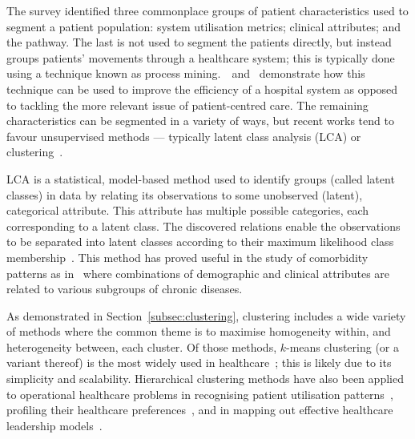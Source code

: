 The survey identified three commonplace groups of patient characteristics used
to segment a patient population: system utilisation metrics; clinical
attributes; and the pathway. The last is not used to segment the patients
directly, but instead groups patients' movements through a healthcare system;
this is typically done using a technique known as process
mining.~\cite{Arnolds2018}~and~\cite{Delias2015} demonstrate how this technique
can be used to improve the efficiency of a hospital system as opposed to
tackling the more relevant issue of patient-centred care. The remaining
characteristics can be segmented in a variety of ways, but recent works tend to
favour unsupervised methods --- typically latent class analysis (LCA) or
clustering~\cite{Yan2018}.

LCA is a statistical, model-based method used to identify groups (called latent
classes) in data by relating its observations to some unobserved (latent),
categorical attribute. This attribute has multiple possible categories, each
corresponding to a latent class. The discovered relations enable the
observations to be separated into latent classes according to their maximum
likelihood class membership~\cite{Hagenaars2002,Lazarsfeld1968}. This method has
proved useful in the study of comorbidity patterns as
in~\cite{Kuwornu2014,Larsen2017} where combinations of demographic and clinical
attributes are related to various subgroups of chronic diseases.

As demonstrated in Section~\ref{subsec:clustering}, clustering includes a wide
variety of methods where the common theme is to maximise homogeneity within, and
heterogeneity between, each cluster. Of those methods, \(k\)-means clustering
(or a variant thereof) is the most widely used in
healthcare~\cite{%
    Elbattah2017,Haraty2015,Ogbuabor2018,Santhi2010,Silitonga2018,Vuik2016a%
}; this is likely due to its simplicity and scalability. Hierarchical clustering
methods have also been applied to operational healthcare problems in recognising
patient utilisation patterns~\cite{Zayas2016}, profiling their healthcare
preferences~\cite{Liu2009}, and in mapping out effective healthcare leadership
models~\cite{Hargett2017}.

